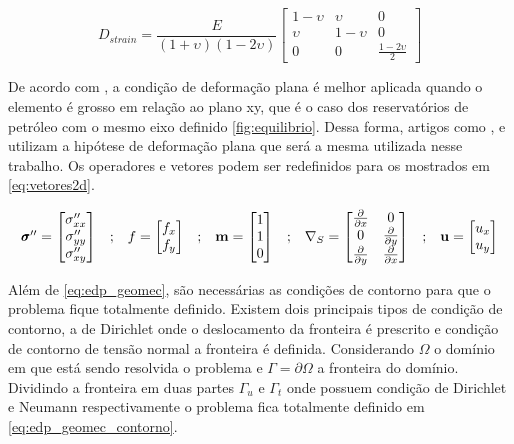\begin{equation} \label{eq:elasticplanestrain}
D_{strain} = \frac{E}{(1+\upsilon)(1-2\upsilon)}
\begin{bmatrix}
 1-\upsilon & \upsilon    &  0 \\
 \upsilon   &  1-\upsilon &  0 \\
 0& 0 & \frac{1-2\upsilon}{2}
\end{bmatrix}
\end{equation}

De acordo com \citet{jacob}, a condição de deformação plana é melhor aplicada quando o elemento é grosso em relação ao plano xy, que é o caso dos reservatórios de petróleo com o mesmo eixo definido \ref{fig:equilibrio}. Dessa forma, artigos como \cite{casteletto}, \cite{planeStrainProblems} e \cite{irina} utilizam a hipótese de deformação plana que será a mesma utilizada nesse trabalho. Os operadores e vetores podem ser redefinidos para os mostrados em \eqref{eq:vetores2d}.

\begin{equation}
\label{eq:vetores2d}
\begin{matrix}
\pmb{\sigma}^{\prime\prime} = \begin{bmatrix}
\sigma^{\prime\prime}_{xx}
\\
\sigma^{\prime\prime}_{yy}
\\
\sigma^{\prime\prime}_{xy}
\end{bmatrix}
&

;

&

f = \begin{bmatrix}
f_{x}
\\
f_{y}
\end{bmatrix}
&
;
&

\mathbf{m} = \begin{bmatrix} 1 \\ 1 \\ 0\end{bmatrix}

&
;

&
\nabla_S = \begin{bmatrix} \frac{\partial { }}{\partial x} & 0 \\ 0 & \frac{\partial { }}{\partial y} \\ \frac{\partial { }}{\partial y} & \frac{\partial { }}{\partial x} \\ \end{bmatrix}

&
;

&

\mathbf{u} = \begin{bmatrix}
u_x
\\
u_y
\end{bmatrix}

\end{matrix}
\end{equation}

Além de \eqref{eq:edp_geomec}, são necessárias as condições de contorno para que o problema fique totalmente definido. Existem dois principais tipos de condição de contorno, a de Dirichlet onde o deslocamento da fronteira é prescrito e condição de contorno de tensão normal a fronteira é definida. Considerando $\Omega$ o domínio em que está sendo resolvida o problema e $\Gamma = \partial \Omega$ a fronteira do domínio. Dividindo a fronteira em duas partes $\Gamma_u$ e $\Gamma_t$ onde possuem condição de Dirichlet e Neumann respectivamente o problema fica totalmente definido em \eqref{eq:edp_geomec_contorno}.



